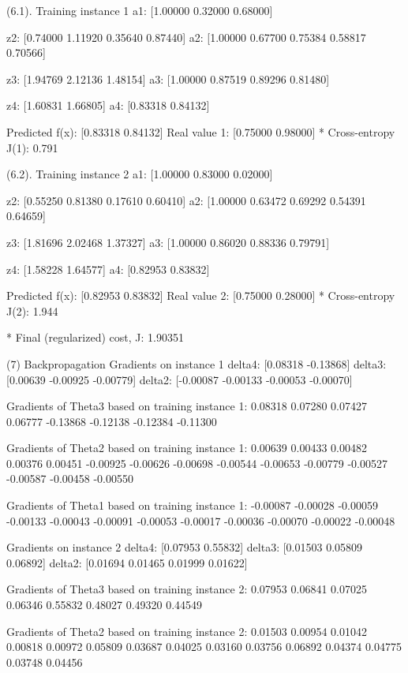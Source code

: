 \documentclass{article}
\begin{document}
(6.1). Training instance 1
a1: [1.00000   0.32000   0.68000]

z2: [0.74000   1.11920   0.35640   0.87440]
a2: [1.00000   0.67700   0.75384   0.58817   0.70566]

z3: [1.94769   2.12136   1.48154]
a3: [1.00000   0.87519   0.89296   0.81480]

z4: [1.60831   1.66805]
a4: [0.83318   0.84132]

Predicted f(x): [0.83318   0.84132]
Real value 1: [0.75000   0.98000]
* Cross-entropy J(1): 0.791

(6.2). Training instance 2
a1: [1.00000   0.83000   0.02000]

z2: [0.55250   0.81380   0.17610   0.60410]
a2: [1.00000   0.63472   0.69292   0.54391   0.64659]

z3: [1.81696   2.02468   1.37327]
a3: [1.00000   0.86020   0.88336   0.79791]

z4: [1.58228   1.64577]
a4: [0.82953   0.83832]

Predicted f(x): [0.82953   0.83832]
Real value 2: [0.75000   0.28000]
* Cross-entropy J(2): 1.944

* Final (regularized) cost, J: 1.90351

(7) Backpropagation
Gradients on instance 1
delta4: [0.08318   -0.13868]
delta3: [0.00639   -0.00925   -0.00779]
delta2: [-0.00087   -0.00133   -0.00053   -0.00070]

Gradients of Theta3 based on training instance 1:
0.08318  0.07280  0.07427  0.06777
-0.13868  -0.12138  -0.12384  -0.11300

Gradients of Theta2 based on training instance 1:
0.00639  0.00433  0.00482  0.00376  0.00451
-0.00925  -0.00626  -0.00698  -0.00544  -0.00653
-0.00779  -0.00527  -0.00587  -0.00458  -0.00550

Gradients of Theta1 based on training instance 1:
-0.00087  -0.00028  -0.00059
-0.00133  -0.00043  -0.00091
-0.00053  -0.00017  -0.00036
-0.00070  -0.00022  -0.00048

Gradients on instance 2
delta4: [0.07953   0.55832]
delta3: [0.01503   0.05809   0.06892]
delta2: [0.01694   0.01465   0.01999   0.01622]

Gradients of Theta3 based on training instance 2:
0.07953  0.06841  0.07025  0.06346
0.55832  0.48027  0.49320  0.44549

Gradients of Theta2 based on training instance 2:
0.01503  0.00954  0.01042  0.00818  0.00972
0.05809  0.03687  0.04025  0.03160  0.03756
0.06892  0.04374  0.04775  0.03748  0.04456
\end{document}
